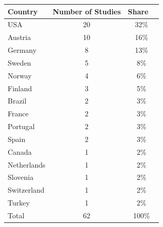 
\begin{tabular}{lcc}
\toprule
\textbf{Country} & \textbf{Number of Studies} & \textbf{Share} \



\\
\midrule
USA & 20 & 32\%\\

Austria & 10 & 16\%\\

Germany & 8 & 13\%\\

Sweden & 5 & 8\%\\

Norway & 4 & 6\%\\

Finland & 3 & 5\%\\

Brazil & 2 & 3\%\\

France & 2 & 3\%\\

Portugal & 2 & 3\%\\

Spain & 2 & 3\%\\

Canada & 1 & 2\%\\

Netherlands & 1 & 2\%\\

Slovenia & 1 & 2\%\\

Switzerland & 1 & 2\%\\

Turkey & 1 & 2\%\\

Total & 62 & 100\%\\
\midrule
\bottomrule
\end{tabular}